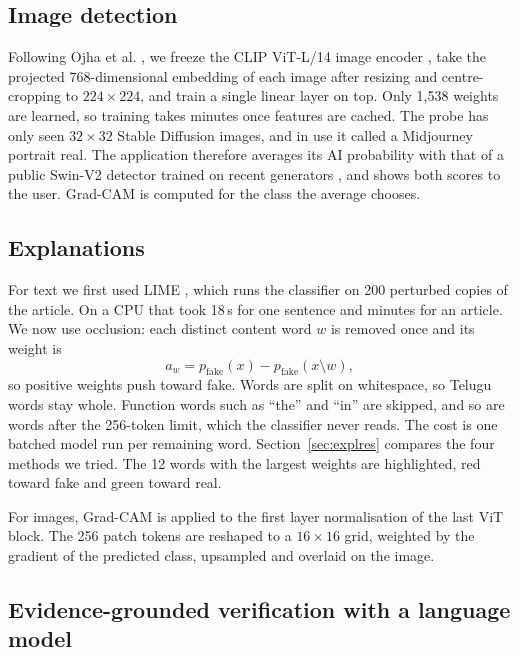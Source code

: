 \documentclass[conference]{IEEEtran}
\begin{document}
\subsection{Image detection}
Following Ojha et al. \cite{ojha2023universal}, we freeze the CLIP ViT-L/14 image encoder \cite{radford2021clip,dosovitskiy2021vit}, take the projected 768-dimensional embedding of each image after resizing and centre-cropping to $224\times224$, and train a single linear layer on top. Only 1,538 weights are learned, so training takes minutes once features are cached. The probe has only seen $32\times32$ Stable Diffusion images, and in use it called a Midjourney portrait real. The application therefore averages its AI probability with that of a public Swin-V2 detector trained on recent generators \cite{haywoodsloan2024detector}, and shows both scores to the user. Grad-CAM is computed for the class the average chooses.

\subsection{Explanations}
For text we first used LIME \cite{ribeiro2016lime}, which runs the classifier on 200 perturbed copies of the article. On a CPU that took 18\,s for one sentence and minutes for an article. We now use occlusion: each distinct content word $w$ is removed once and its weight is
\begin{equation}
a_w = p_{\text{fake}}(x) - p_{\text{fake}}(x \setminus w),
\end{equation}
so positive weights push toward fake. Words are split on whitespace, so Telugu words stay whole. Function words such as ``the'' and ``in'' are skipped, and so are words after the 256-token limit, which the classifier never reads. The cost is one batched model run per remaining word. Section~\ref{sec:explres} compares the four methods we tried. The 12 words with the largest weights are highlighted, red toward fake and green toward real.

For images, Grad-CAM \cite{selvaraju2017gradcam} is applied to the first layer normalisation of the last ViT block. The 256 patch tokens are reshaped to a $16\times16$ grid, weighted by the gradient of the predicted class, upsampled and overlaid on the image.

\subsection{Evidence-grounded verification with a language model}
\label{sec:llm}
\end{document}

